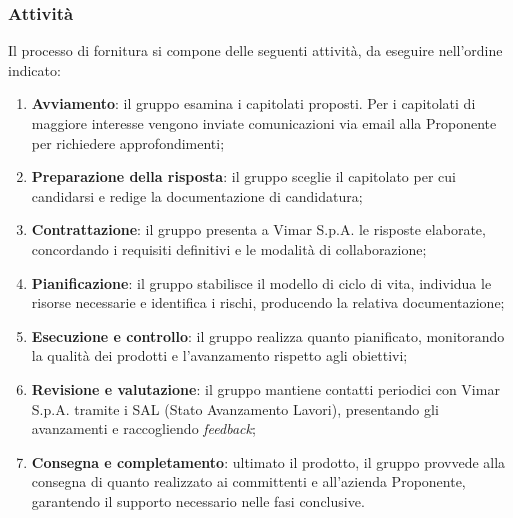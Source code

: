 \documentclass[10pt, letterpaper]{article}
\begin{document}
\subsubsection{Attività}
Il processo di fornitura si compone delle seguenti attività, da eseguire nell'ordine indicato:
\begin{enumerate}
    \item \textbf{Avviamento}: il gruppo esamina i capitolati proposti. Per i capitolati di maggiore interesse vengono inviate comunicazioni via email alla Proponente per richiedere approfondimenti;
    \item \textbf{Preparazione della risposta}: il gruppo sceglie il capitolato per cui candidarsi e redige la documentazione di candidatura;
    \item \textbf{Contrattazione}: il gruppo presenta a Vimar S.p.A. le risposte elaborate, concordando i requisiti definitivi e le modalità di collaborazione;
    \item \textbf{Pianificazione}: il gruppo stabilisce il modello di ciclo di vita, individua le risorse necessarie e identifica i rischi, producendo la relativa documentazione;
    \item \textbf{Esecuzione e controllo}: il gruppo realizza quanto pianificato, monitorando la qualità dei prodotti e l'avanzamento rispetto agli obiettivi;
    \item \textbf{Revisione e valutazione}: il gruppo mantiene contatti periodici con Vimar S.p.A. tramite i SAL (Stato Avanzamento Lavori), presentando gli avanzamenti e raccogliendo \textit{feedback};
    \item \textbf{Consegna e completamento}: ultimato il prodotto, il gruppo provvede alla consegna di quanto realizzato ai committenti e all'azienda Proponente, garantendo il supporto necessario nelle fasi conclusive.
\end{enumerate}
\end{document}
